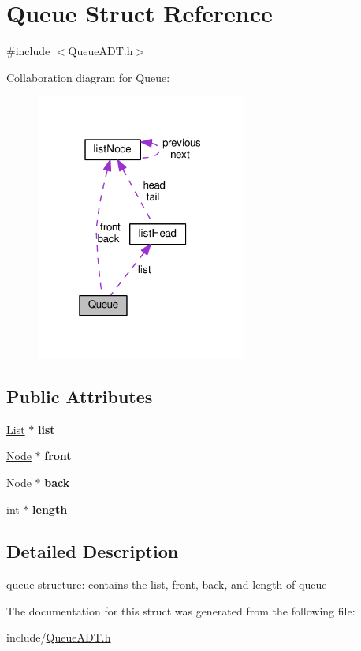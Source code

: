 \hypertarget{structQueue}{}\section{Queue Struct Reference}
\label{structQueue}


{\ttfamily \#include $<$Queue\+A\+D\+T.\+h$>$}



Collaboration diagram for Queue\+:
\nopagebreak
\begin{figure}[H]
\begin{center}
\leavevmode
\includegraphics[width=196pt]{structQueue__coll__graph}
\end{center}
\end{figure}
\subsection*{Public Attributes}
\begin{DoxyCompactItemize}
\item 
\mbox{\label{structQueue_a41c7eb433a01719af10cd2dc998ebdd8}} 
\hyperlink{LinkedListAPI_8h_a87906180aa2c50677fa64f2f44a25bf0}{List} $\ast$ {\bfseries list}
\item 
\mbox{\label{structQueue_a36ab375d24d41bcc1d598c132700835b}} 
\hyperlink{LinkedListAPI_8h_a2b677d2e8ffc156e6b24a55e7338ecad}{Node} $\ast$ {\bfseries front}
\item 
\mbox{\label{structQueue_aaf188b8da9524a67e909f14d78563dab}} 
\hyperlink{LinkedListAPI_8h_a2b677d2e8ffc156e6b24a55e7338ecad}{Node} $\ast$ {\bfseries back}
\item 
\mbox{\label{structQueue_a3c0430ed080b9095895b73241ef859ac}} 
int $\ast$ {\bfseries length}
\end{DoxyCompactItemize}


\subsection{Detailed Description}
queue structure\+: contains the list, front, back, and length of queue 

The documentation for this struct was generated from the following file\+:\begin{DoxyCompactItemize}
\item 
include/\hyperlink{QueueADT_8h}{Queue\+A\+D\+T.\+h}\end{DoxyCompactItemize}
